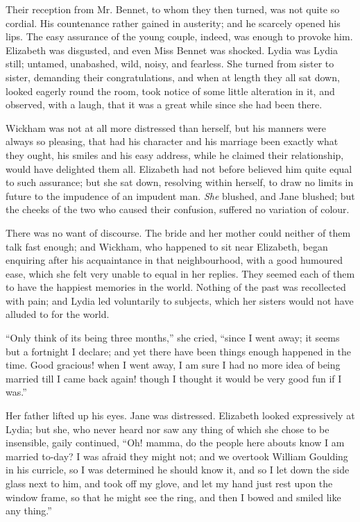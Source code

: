 Their reception from Mr. Bennet, to whom they then
turned, was not quite so cordial. His countenance rather
gained in austerity; and he scarcely opened his lips.
The easy assurance of the young couple, indeed, was
enough to provoke him. Elizabeth was disgusted, and
even Miss Bennet was shocked. Lydia was Lydia still;
untamed, unabashed, wild, noisy, and fearless. She turned
from sister to sister, demanding their congratulations, and
when at length they all sat down, looked eagerly round
the room, took notice of some little alteration in it, and
observed, with a laugh, that it was a great while since
she had been there.

Wickham was not at all more distressed than herself,
but his manners were always so pleasing, that had his
character and his marriage been exactly what they ought,
his smiles and his easy address, while he claimed their
relationship, would have delighted them all. Elizabeth
had not before believed him quite equal to such assurance;
but she sat down, resolving within herself, to draw no
limits in future to the impudence of an impudent man.
\textit{She} blushed, and Jane blushed; but the cheeks of the
two who caused their confusion, suffered no variation of
colour.

There was no want of discourse. The bride and her
mother could neither of them talk fast enough; and
Wickham, who happened to sit near Elizabeth, began
enquiring after his acquaintance in that neighbourhood,
with a good humoured ease, which she felt very unable
to equal in her replies. They seemed each of them to have
the happiest memories in the world. Nothing of the past
was recollected with pain; and Lydia led voluntarily to
subjects, which her sisters would not have alluded to for
the world.

“Only think of its being three months,” she cried,
“since I went away; it seems but a fortnight I declare;
and yet there have been things enough happened in the
time. Good gracious! when I went away, I am sure
I had no more idea of being married till I came back
again! though I thought it would be very good fun if
I was.”

Her father lifted up his eyes. Jane was distressed.
Elizabeth looked expressively at Lydia; but she, who
never heard nor saw any thing of which she chose to be
insensible, gaily continued, “Oh! mamma, do the people
here abouts know I am married to-day? I was afraid
they might not; and we overtook William Goulding in
his curricle, so I was determined he should know it, and
so I let down the side glass next to him, and took off my
glove, and let my hand just rest upon the window frame,
so that he might see the ring, and then I bowed and
smiled like any thing.”

